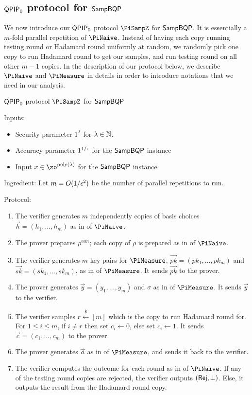 \subsection{$\operatorname{\mathsf{QPIP}}_0$ protocol for $\operatorname{\mathsf{SampBQP}}$} \label{sec:qpip0}

We now introduce our $\operatorname{\mathsf{QPIP}}_0$ protocol $\PiSampZ$ for $\operatorname{\mathsf{SampBQP}}$.
It is essentially a $m$-fold parallel repetition of $\PiNaive$.
Instead of having each copy running testing round or Hadamard round uniformly at random, we randomly pick one copy to run Hadamard round to get our samples, and run testing round on all other $m-1$ copies.
In the description of our protocol below, we describe $\PiNaive$ and $\PiMeasure$ in details  in order to introduce notations that we need in our analysis.

\begin{protocol}{$\operatorname{\mathsf{QPIP}}_0$ protocol $\PiSampZ$ for $\operatorname{\mathsf{SampBQP}}$}
	\label{proto:QPIP0samp}

	Inputs:
	\begin{itemize}
		\item Security parameter $1^\lambda$ for $\lambda\in\mathbb{N}$.
		\item Accuracy parameter $1^{1/\epsilon}$ for the $\operatorname{\mathsf{SampBQP}}$ instance
		\item Input $x\in\zo^{\poly(\lambda)}$ for the $\operatorname{\mathsf{SampBQP}}$ instance
	\end{itemize}

	Ingredient: Let $m=O(1/\epsilon^2)$ be the number of parallel repetitions to run.

	Protocol:
	\begin{enumerate}
		\item The verifier generates $m$ independently copies of basis choices $\vec{h}=(h_1,\ldots,h_m)$ as in  of $\PiNaive$.
		\item The prover prepares $\rho^{\otimes m}$; each copy of $\rho$ is prepared as in  of $\PiNaive$.
		\item The verifier generates $m$ key pairs for $\PiMeasure$, $\vec{pk}=(pk_1,\ldots,pk_m)$ and $\vec{sk}=(sk_1,\ldots,sk_m)$, as in  of $\PiMeasure$.
			It sends $\vec{pk}$ to the prover.
		\item The prover generates $\vec{y}=(y_1,\ldots,y_m)$ and $\sigma$ as in  of $\PiMeasure$.
			It sends $\vec{y}$ to the verifier.
		\item The verifier samples $r\xleftarrow{\$}[m]$ which is the copy to run Hadamard round for.
			For $1\leq i\leq m$, if $i\ne r$ then set $c_i\leftarrow 0$, else set $c_i\leftarrow 1$.
			It sends $\vec{c}=(c_1,\ldots,c_m)$ to the prover.
		\item The prover generates $\vec{a}$ as in  of $\PiMeasure$, and sends it back to the verifier.
		\item \label{step:multi-testing}
			The verifier computes the outcome for each round as in  of $\PiNaive$.
			If any of the testing round copies are rejected, the verifier outputs $(\mathsf{Rej}, \bot)$.
			Else, it outputs the result from the Hadamard round copy.
	\end{enumerate}
\end{protocol}

